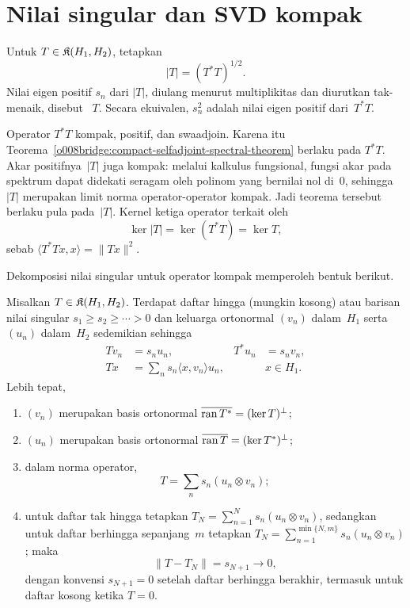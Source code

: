 \section{Nilai singular dan SVD kompak}

\begin{defn}\label{o008bridge:absolute-value-singular-values}
Untuk $T\in\mathfrak{K}(H_1,H_2)$, tetapkan
\[
 |T|=(T^*T)^{1/2}.
\]
Nilai eigen positif $s_n$ dari $|T|$, diulang menurut multiplikitas dan
diurutkan tak-menaik, disebut ~$T$. Secara ekuivalen,
$s_n^2$ adalah nilai eigen positif dari~$T^*T$.
\end{defn}

Operator $T^*T$ kompak, positif, dan swaadjoin. Karena itu
Teorema~\ref{o008bridge:compact-selfadjoint-spectral-theorem} berlaku pada
$T^*T$. Akar positifnya~$|T|$ juga kompak: melalui kalkulus fungsional,
fungsi akar pada spektrum dapat didekati seragam oleh polinom yang bernilai
nol di~$0$, sehingga $|T|$ merupakan limit norma operator-operator kompak.
Jadi teorema tersebut berlaku pula pada~$|T|$. Kernel ketiga operator terkait oleh
\[
 \ker|T|=\ker(T^*T)=\ker T,
\]
sebab $\langle T^*Tx,x\rangle=\|Tx\|^2$.

Dekomposisi nilai singular untuk operator kompak memperoleh bentuk berikut.

\begin{thm}
\label{o008bridge:compact-svd}
Misalkan $T\in\mathfrak{K}(H_1,H_2)$. Terdapat daftar hingga (mungkin kosong) atau
barisan nilai singular $s_1\geq s_2\geq\cdots>0$ dan keluarga ortonormal
$(v_n)$ dalam~$H_1$ serta $(u_n)$ dalam~$H_2$ sedemikian sehingga
\begin{align*}
  T v_n&=s_nu_n, & T^*u_n&=s_nv_n,\\
  Tx&=\sum_n s_n\langle x,v_n\rangle u_n,
      &&x\in H_1.
\end{align*}
Lebih tepat,
\begin{enumerate}[label=\rm{(\alph*)}]
  \item $(v_n)$ merupakan basis ortonormal
        $\overline{\operatorname{ran} T^*}=(\ker T)^\perp$;
  \item $(u_n)$ merupakan basis ortonormal
        $\overline{\operatorname{ran} T}=(\ker T^*)^\perp$;
  \item dalam norma operator,
        \[
          T=\sum_n s_n(u_n\otimes v_n);
        \]
  \item untuk daftar tak hingga tetapkan
        $T_N=\sum_{n=1}^Ns_n(u_n\otimes v_n)$, sedangkan untuk daftar
        berhingga sepanjang~$m$ tetapkan
        $T_N=\sum_{n=1}^{\min\{N,m\}}s_n(u_n\otimes v_n)$; maka
        \[
          \|T-T_N\|=s_{N+1}\longrightarrow0,
        \]
        dengan konvensi $s_{N+1}=0$ setelah daftar berhingga berakhir,
        termasuk untuk daftar kosong ketika $T=0$.
\end{enumerate}
\end{thm}

